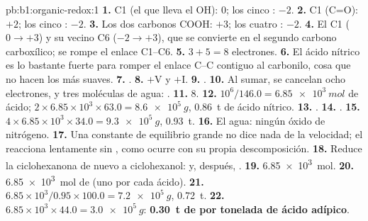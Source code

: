 \begin{solution}{pb:b1:organic-redox:1}
\textbf{1.} C1 (el que lleva el OH): 0; los cinco : $-2$.
\textbf{2.} C1 (C=O): $+2$; los cinco : $-2$.
\textbf{3.} Los dos carbonos COOH: $+3$; los cuatro : $-2$.
\textbf{4.} El C1 ($0 \to +3$) y su vecino C6 ($-2 \to +3$), que se
convierte en el segundo carbono carboxílico; se rompe el enlace C1--C6.
\textbf{5.} $3 + 5 = 8$ electrones.
\textbf{6.} El ácido nítrico es lo bastante fuerte para romper el enlace
C--C contiguo al carbonilo, cosa que no hacen los  más suaves.
\textbf{7.} .
\textbf{8.} $+$V y $+$I.
\textbf{9.} .
\textbf{10.} Al sumar, se cancelan ocho electrones,  y tres
moléculas de agua: .
\textbf{11.} 8.
\textbf{12.} $10^6/146.0 = \qty{6.85e3}{mol}$ de ácido; $2 \times 6.85 \times
10^3 \times 63.0 = \qty{8.6e5}{g}$, \qty{0.86}{t} de ácido nítrico.
\textbf{13.} .
\textbf{14.} .
\textbf{15.} $4 \times 6.85 \times 10^3 \times 34.0 = \qty{9.3e5}{g}$,
\qty{0.93}{t}.
\textbf{16.} El agua: ningún óxido de nitrógeno.
\textbf{17.} Una constante de equilibrio grande no dice nada de la
velocidad; el  reacciona lentamente sin , como ocurre
con su propia descomposición.
\textbf{18.} Reduce la ciclohexanona de nuevo a ciclohexanol:
 y, después,
.
\textbf{19.} \qty{6.85e3}{mol}.
\textbf{20.} \qty{6.85e3}{mol} de  (uno por cada ácido).
\textbf{21.} $6.85 \times 10^3/0.95 \times 100.0 = \qty{7.2e5}{g}$, \qty{0.72}{t}.
\textbf{22.} $6.85 \times 10^3 \times 44.0 = \qty{3.0e5}{g}$: \textbf{\qty{0.30}{t}
de  por tonelada de ácido adípico}.
\end{solution}
